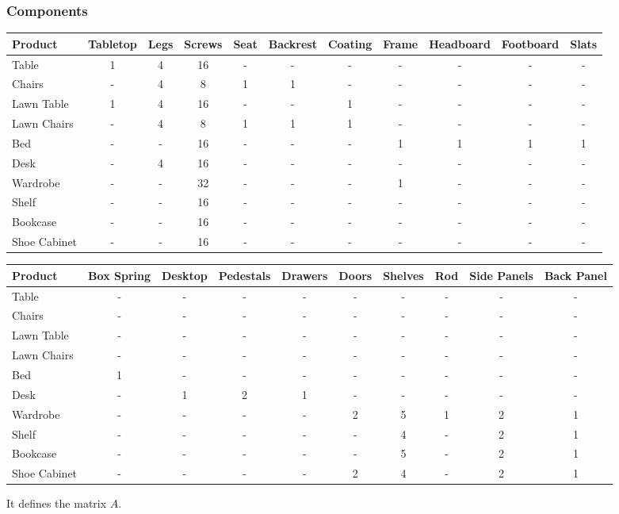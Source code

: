 \documentclass{amsart}
\begin{document}
\subsubsection{Components}
\small
\begin{longtable}{| l | c | c | c | c | c | c | c | c | c | c |}
\hline
\textbf{Product} & \textbf{Tabletop} & \textbf{Legs} & \textbf{Screws} & \textbf{Seat} & \textbf{Backrest} & \textbf{Coating} & \textbf{Frame} & \textbf{Headboard} & \textbf{Footboard } & \textbf{Slats } \\ 
\hline
Table & 1 & 4 & 16 & - & - & - & - & - & - & - \\ 
\hline
Chairs & - & 4 & 8 & 1 & 1 & - & - & - & - & - \\ 
\hline
Lawn Table & 1 & 4 & 16 & - & - & 1 & - & - & - & - \\ 
\hline
Lawn Chairs & - & 4 & 8 & 1 & 1 & 1 & - & - & - & - \\ 
\hline
Bed & - & - & 16 & - & - & - & 1 & 1 & 1 & 1 \\ 
\hline
Desk & - & 4 & 16 & - & - & - & - & - & - & - \\ 
\hline
Wardrobe & - & - & 32 & - & - & - & 1 & - & - & - \\ 
\hline
Shelf & - & - & 16 & - & - & - & - & - & - & - \\ 
\hline
Bookcase & - & - & 16 & - & - & - & - & - & - & - \\ 
\hline
Shoe Cabinet & - & - & 16 & - & - & - & - & - & - & - \\ 
\hline
\end{longtable}

\small
\begin{longtable}{| l | c | c | c | c | c | c | c | c | c |}
\hline
\textbf{Product} & \textbf{Box Spring} & \textbf{Desktop} & \textbf{Pedestals} & \textbf{Drawers} & \textbf{Doors} & \textbf{Shelves} & \textbf{Rod} & \textbf{Side Panels} & \textbf{Back Panel} \\
\hline
Table & - & - & - & - & - & - & - & - & - \\
\hline
Chairs & - & - & - & - & - & - & - & - & - \\
\hline
Lawn Table & - & - & - & - & - & - & - & - & - \\
\hline
Lawn Chairs & - & - & - & - & - & - & - & - & - \\
\hline
Bed & 1 & - & - & - & - & - & - & - & - \\
\hline
Desk & - & 1 & 2 & 1 & - & - & - & - & - \\
\hline
Wardrobe & - & - & - & - & 2 & 5 & 1 & 2 & 1 \\
\hline
Shelf & - & - & - & - & - & 4 & - & 2 & 1 \\
\hline
Bookcase & - & - & - & - & - & 5 & - & 2 & 1 \\
\hline
Shoe Cabinet & - & - & - & - & 2 & 4 & - & 2 & 1 \\
\hline
\end{longtable}
It defines the matrix $A$.
\end{document}
